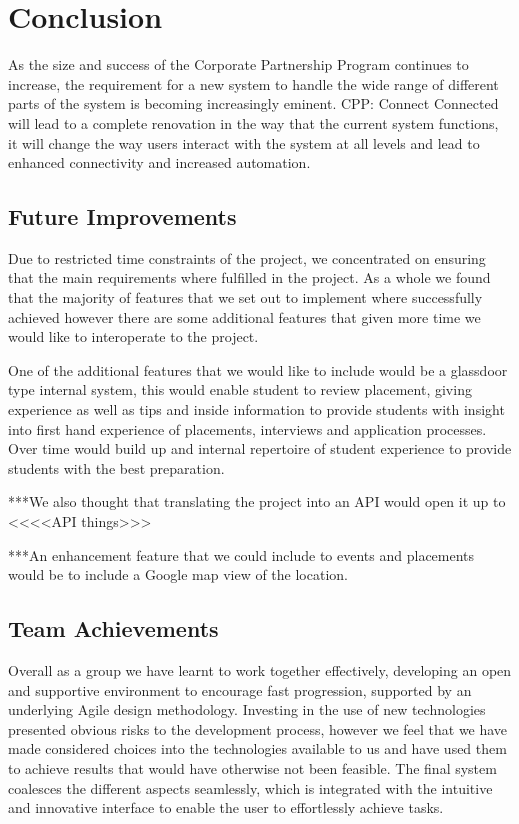 \section{Conclusion}
As the size and success of the Corporate Partnership Program continues to increase, the requirement for a new system to handle the wide range of different parts of the system is becoming increasingly eminent. CPP: Connect Connected will lead to a complete renovation in the way that the current system functions, it will change the way users interact with the system at all levels and lead to enhanced connectivity and increased automation.
	
	\subsection{Future Improvements}
		Due to restricted time constraints of the project, we concentrated on ensuring that the main requirements where fulfilled in the project. As a whole we found that the majority of features that we set out to implement where successfully achieved however there are some additional features that given more time we would like to interoperate to the project.

		One of the additional features that we would like to include would be a glassdoor type internal system, this would enable student to review placement, giving experience as well as tips and inside information to provide students with insight into first hand experience of placements, interviews and application processes. Over time would build up and internal repertoire of student experience to provide students with the best preparation.

		***We also thought that translating the project into an API would open it up to <<<<API things>>>
		
		***An enhancement feature that we could include to events and placements would be to include a Google map view of the location.

	\subsection{Team Achievements}
		Overall as a group we have learnt to work together effectively, developing an open and supportive environment to encourage fast progression, supported by an underlying Agile design methodology.
		Investing in the use of new technologies presented obvious risks to the development process, however we feel that we have made considered choices into the technologies available to us and have used them to achieve results that would have otherwise not been feasible. The final system coalesces the different aspects seamlessly, which is integrated with the intuitive and innovative interface to enable the user to effortlessly achieve tasks.
		

